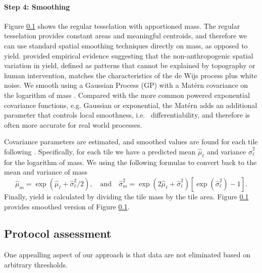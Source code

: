 \paragraph{Step 4: Smoothing} Figure \ref{} shows the regular
tesselation with apportioned mass.  The regular tesselation provides
constant areas and meaningful centroids, and therefore we can use
standard spatial smoothing techniques directly on mass, as opposed to
yield. \cite{McCullagh2006} provided empirical evidence suggesting
that the non-anthropogenic spatial variation in yield, defined as
patterns that cannot be explained by topography or human intervention,
matches the characteristics of the de Wijs process plus white
noise. We smooth using a Gaussian Process (GP) with a Mat\'ern
covariance on the logarithm of mass
\citep{handcock1993bayesian,gutt2006studies}. Compared with the more
common powered exponential covariance functions, e.g. Gaussian or
exponential, the Mat\'ern adds an additional parameter that controls
local smoothness, i.e. \ differentiability, and therefore is often
more accurate for real world processes.

Covariance parameters are estimated, and smoothed values are found for
each tile following \cite{Cressie1993}.  Specifically, for each tile
we have a predicted mean $\hat\mu_{\ell}$ and variance
$\hat\sigma^2_{\ell}$ for the logarithm of mass.  We using the
following formulas to convert back to the mean and variance of mass
\[ \hat{\mu}_{m} = \exp\left(\hat{\mu}_{\ell} +
\hat{\sigma}^2_{\ell}/2\right), \quad\mbox{and}\quad
\hat{\sigma}^2_{m} = \exp\left(2 \hat{\mu}_{\ell} +
\hat{\sigma}^2_{\ell}\right)
\left[\exp\left(\hat{\sigma}^2_{\ell}\right) - 1\right].
 \] Finally, yield is calculated by dividing the tile mass by the tile
area.  Figure \ref{} provides smoothed version of Figure \ref{}.

\subsection{Protocol assessment}

One appealling aspect of our approach is that data are not eliminated
based on arbitrary thresholds.





